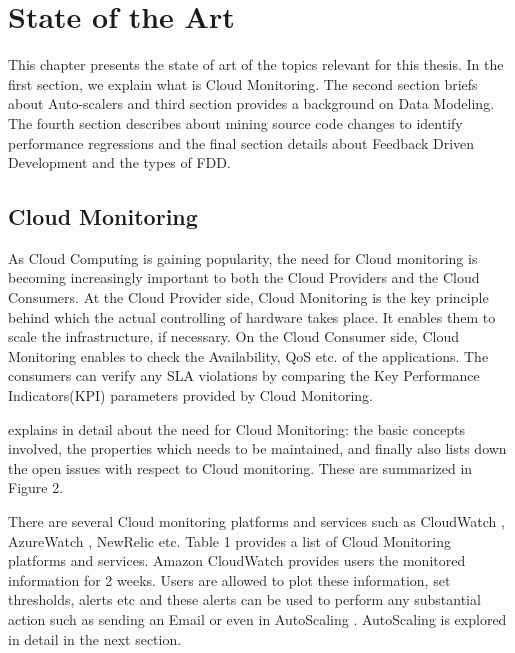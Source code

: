 \documentclass[article,type=msc,colorback,12pt,accentcolor=tud7b]{tudthesis}
\begin{document}

	\cleardoublepage

 \section{State of the Art}
 	
	This chapter presents the state of art of the topics relevant for this thesis. In the first section, we explain what is Cloud Monitoring. The second section briefs about Auto-scalers and third section provides a background on Data Modeling. The fourth section describes about mining source code changes to identify performance regressions and the final section details about Feedback Driven Development and the types of FDD. 
	
	\subsection{Cloud Monitoring}
 	
 	As Cloud Computing is gaining popularity, the need for Cloud monitoring is becoming increasingly important to  both the Cloud Providers and the Cloud Consumers. At the Cloud Provider side, Cloud Monitoring is the key principle behind which the actual controlling of hardware takes place. It enables them to scale the infrastructure, if necessary. On the Cloud Consumer side, Cloud Monitoring enables to check the Availability, QoS etc. of the applications. The consumers can verify any SLA violations by comparing the Key Performance Indicators(KPI) parameters provided by Cloud Monitoring.
 	
 	\cite{aceto2013cloud} explains in detail about the need for Cloud Monitoring: the basic concepts involved, the properties which needs to be maintained, and finally also lists down the open issues with respect to Cloud monitoring. These are summarized in Figure 2.
	
	There are several Cloud monitoring platforms and services such as CloudWatch \cite{cloudwatchdev} \cite{cloudwatch}, AzureWatch \cite{azurewatch} , NewRelic \cite{newrelic} etc. Table 1 provides a list of Cloud Monitoring platforms and services. Amazon CloudWatch provides users the monitored information for 2 weeks. Users are allowed to plot these information, set thresholds, alerts etc and these alerts can be used to perform any substantial action such as sending an Email or even in AutoScaling \cite{aas}. AutoScaling is explored in detail in the next section. 
	
\end{document}

